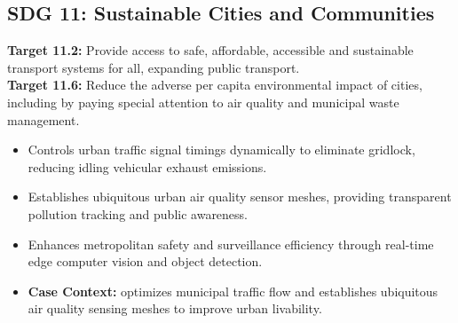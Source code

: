 \subsection{SDG 11: Sustainable Cities and Communities}
\noindent\textbf{Target 11.2:} Provide access to safe, affordable, accessible and sustainable transport systems for all, expanding public transport. \\
\noindent\textbf{Target 11.6:} Reduce the adverse per capita environmental impact of cities, including by paying special attention to air quality and municipal waste management.
\begin{itemize}
  \item Controls urban traffic signal timings dynamically to eliminate gridlock, reducing idling vehicular exhaust emissions.
  \item Establishes ubiquitous urban air quality sensor meshes, providing transparent pollution tracking and public awareness.
  \item Enhances metropolitan safety and surveillance efficiency through real-time edge computer vision and object detection.
  \item \textbf{Case Context:} optimizes municipal traffic flow and establishes ubiquitous air quality sensing meshes to improve urban livability.
\end{itemize}
